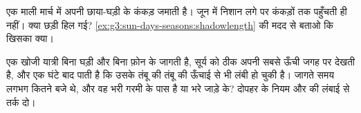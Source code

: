 \begin{exercise}[$\star\star$]\label{exo:g3:sun-days-seasons:10}
एक माली मार्च में अपनी छाया-घड़ी के कंकड़ जमाती है। जून में 
निशान लगे  पर कंकड़ों तक पहुँचती ही नहीं। क्या छड़ी हिल गई?
\cref{ex:g3:sun-days-seasons:shadowlength} की मदद से बताओ कि खिसका
क्या।
\end{exercise}

\begin{exercise}[$\star\star$]\label{exo:g3:sun-days-seasons:11}
एक खोजी यात्री बिना घड़ी और बिना फ़ोन के जागती है, सूर्य को ठीक अपनी
सबसे ऊँची जगह पर देखती है, और एक घंटे बाद पाती है कि उसके तंबू की 
तंबू की ऊँचाई से भी लंबी हो चुकी है। जागते समय लगभग कितने बजे थे, और
वह भरी गरमी के पास है या भरे जाड़े के? दोपहर के नियम और  की लंबाई
से तर्क दो।
\end{exercise}
